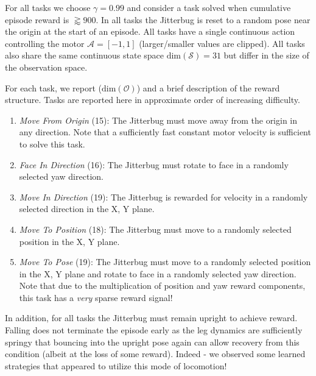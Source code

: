 \documentclass[letterpaper, 10 pt, conference]{ieeeconf}
\begin{document}
For all tasks we choose $\gamma = 0.99$ and consider a task solved when cumulative episode reward is $\gtrapprox 900$.
In all tasks the Jitterbug is reset to a random pose near the origin at the start of an episode.
All tasks have a single continuous action controlling the motor $\mathcal{A} = [-1, 1]$ (larger/smaller values are clipped).
All tasks also share the same continuous state space $\text{dim}(\mathcal{S}) = 31$ but differ in the size of the observation space.

For each task, we report ($\text{dim}(\mathcal{O})$) and a brief description of the reward structure.
Tasks are reported here in approximate order of increasing difficulty.

\begin{enumerate}
    
    \item \emph{Move From Origin} (15): The Jitterbug must move away from the origin in any direction.
    Note that a sufficiently fast constant motor velocity is sufficient to solve this task.
    
    \item \emph{Face In Direction} (16): The Jitterbug must rotate to face in a randomly selected yaw direction.
    
    \item \emph{Move In Direction} (19): The Jitterbug is rewarded for velocity in a randomly selected direction in the X, Y plane.
    
    \item \emph{Move To Position} (18): The Jitterbug must move to a randomly selected position in the X, Y plane.
    
    \item \emph{Move To Pose} (19): The Jitterbug must move to a randomly selected position in the X, Y plane and rotate to face in a randomly selected yaw direction.
    Note that due to the multiplication of position and yaw reward components, this task has a \emph{very} sparse reward signal!
    
\end{enumerate}

In addition, for all tasks the Jitterbug must remain upright to achieve reward.
Falling does not terminate the episode early as the leg dynamics are sufficiently springy that bouncing into the upright pose again can allow recovery from this condition (albeit at the loss of some reward).
Indeed - we observed some learned strategies that appeared to utilize this mode of locomotion!
\end{document}
